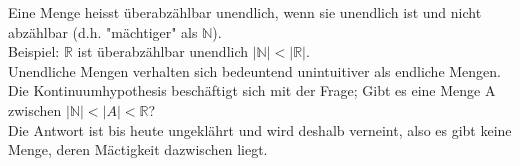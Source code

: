 \documentclass[../gruppenarbeit_1.tex]{subfiles}
\begin{document}
Eine Menge heisst überabzählbar unendlich, wenn sie unendlich ist und nicht abzählbar (d.h. "mächtiger" als $\mathbb{N}$).\\
Beispiel: $\mathbb{R}$ ist überabzählbar unendlich $|\mathbb{N}| < |\mathbb{R}|$.\\

Unendliche Mengen verhalten sich bedeuntend unintuitiver als endliche Mengen.\\

Die Kontinuumhypothesis beschäftigt sich mit der Frage; Gibt es eine Menge A zwischen $|\mathbb{N}| < |A| < \mathbb{R}$?\\
Die Antwort ist bis heute ungeklährt und wird deshalb verneint, also es gibt keine Menge, deren Mäctigkeit dazwischen liegt.
\end{document}
